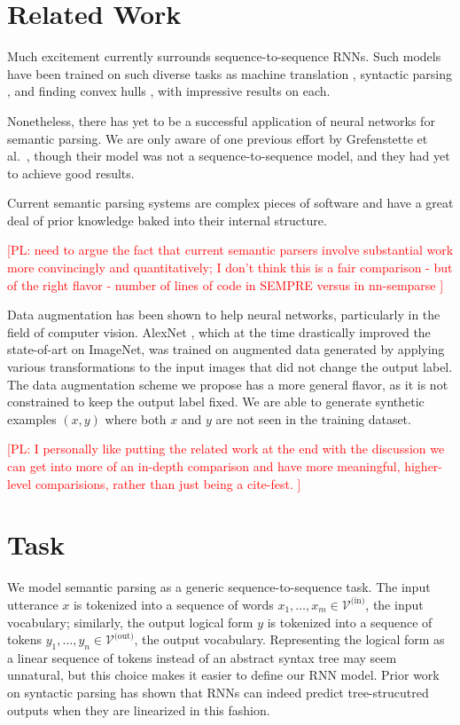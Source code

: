 \documentclass[11pt,letterpaper]{article}
\newcommand{\vocabin}{\mathcal{V}^{\text{(in)}}}
\newcommand{\vocabout}{\mathcal{V}^{\text{(out)}}}
\newcommand\pl[1]{\textcolor{red}{[PL: #1]}}
\begin{document}
\section{Related Work}
Much excitement currently surrounds sequence-to-sequence RNNs.
Such models have been trained on such diverse tasks as
machine translation \cite{sutskever2014sequence,bahdanau2014neural}, 
syntactic parsing \cite{vinyals2015grammar}, and 
finding convex hulls \cite{vinyals2015pointer}, with impressive results on each.

Nonetheless, there has yet to be a successful application of
neural networks for semantic parsing.
We are only aware of one previous effort 
by Grefenstette et al.~,
though their model was not a sequence-to-sequence model,
and they had yet to achieve good results.

Current semantic parsing systems are complex pieces of software 
and have a great deal of prior knowledge baked into their internal structure.

\pl{need to argue the fact that current semantic parsers involve substantial
  work more convincingly and quantitatively;
  I don't think this is a fair comparison - but of the right flavor - number of lines
  of code in SEMPRE versus in nn-semparse
}

Data augmentation has been shown to help neural networks,
particularly in the field of computer vision.
AlexNet \cite{krizhevsky2012imagenet}, 
which at the time drastically improved
the state-of-art on ImageNet,
was trained on augmented data generated by applying various transformations
to the input images that did not change the output label.
The data augmentation scheme we propose has a more general flavor,
as it is not constrained to keep the output label fixed.
We are able to generate synthetic examples $(x, y)$
where both $x$ and $y$ are not seen in the training dataset.

\pl{I personally like putting the related work at the end with the discussion
we can get into more of an in-depth comparison and have more meaningful,
higher-level comparisions, rather than just being a cite-fest.
}

\section{Task}
We model semantic parsing as a generic sequence-to-sequence task.
The input utterance $x$ is tokenized into a sequence of words $x_1, \dotsc, x_m
\in \vocabin$, the input vocabulary;
similarly, the output logical form $y$ is tokenized
into a sequence of tokens $y_1, \dotsc, y_n \in \vocabout$, the output vocabulary.
Representing the logical form as a linear sequence of tokens
instead of an abstract syntax tree may seem unnatural,
but this choice makes it easier to define our RNN model.
Prior work on syntactic parsing 
\cite{vinyals2015grammar} has shown that
RNNs can indeed predict tree-strucutred outputs
when they are linearized in this fashion.
\end{document}
